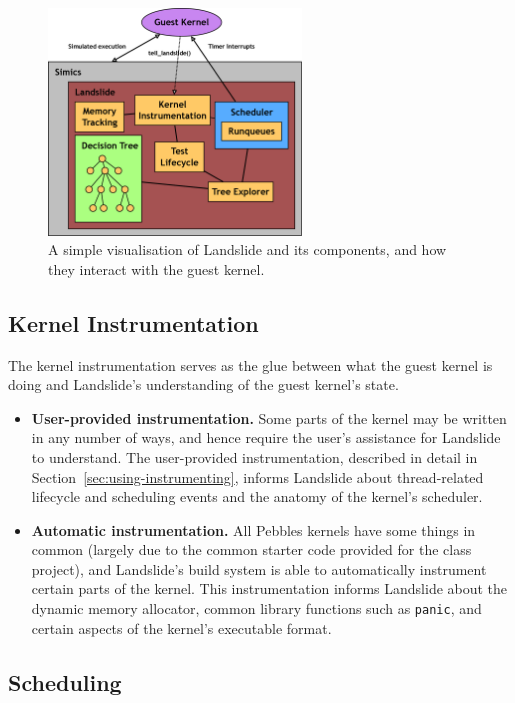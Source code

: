 \begin{figure}[h]
	\centering
	\includegraphics[width=0.6\textwidth]{landslide.png}
	\caption{A simple visualisation of Landslide and its components, and how they interact with the guest kernel.}
	\label{fig:landslide}
\end{figure}

\subsection{Kernel Instrumentation}
\label{sec:components-kern}

The kernel instrumentation serves as the glue between what the guest kernel is doing and Landslide's understanding of the guest kernel's state.

\begin{itemize}
	\item {\bf User-provided instrumentation.} Some parts of the kernel may be written in any number of ways, and hence require the user's assistance for Landslide to understand. The user-provided instrumentation, described in detail in Section~\ref{sec:using-instrumenting}, informs Landslide about thread-related lifecycle and scheduling events and the anatomy of the kernel's scheduler.
	\item {\bf Automatic instrumentation.} All Pebbles kernels have some things in common (largely due to the common starter code provided for the class project), and Landslide's build system is able to automatically instrument certain parts of the kernel. This instrumentation informs Landslide about the dynamic memory allocator, common library functions such as \texttt{panic}, and certain aspects of the kernel's executable format.
\end{itemize}

\subsection{Scheduling}
\label{sec:components-sched}

